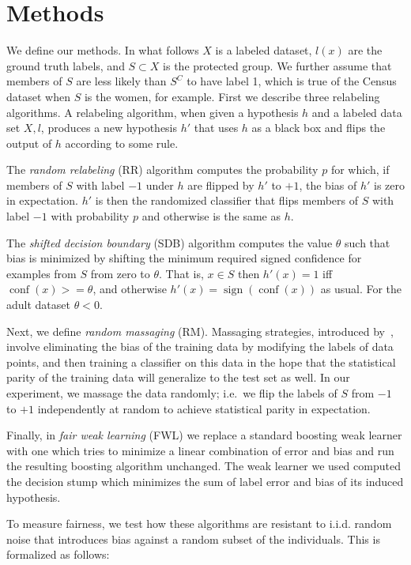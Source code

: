 \documentclass{article}
\DeclareMathOperator{\sign}{sign}
\DeclareMathOperator{\conf}{conf}
\begin{document}
\section{Methods} \label{sec:methods}

We define our methods. In what follows $X$ is a labeled dataset, $l(x)$ are the
ground truth labels, and $S \subset X$ is the protected group.  We further
assume that members of $S$ are less likely than $S^C$ to have label 1, which is
true of the Census dataset when $S$ is the women, for example.  First we
describe three relabeling algorithms.  A relabeling algorithm, when given a
hypothesis $h$ and a labeled data set $X, l$, produces a new hypothesis $h'$
that uses $h$ as a black box and flips the output of $h$ according to some
rule.

The \emph{random relabeling} (RR) algorithm computes the probability
$p$ for which, if members of $S$ with label $-1$ under $h$ are flipped by $h'$
to $+1$, the bias of $h'$ is zero in expectation.  $h'$ is then the randomized
classifier that flips members of $S$ with label $-1$ with probability $p$ and
otherwise is the same as $h$.

The \emph{shifted decision boundary} (SDB) algorithm computes the value
$\theta$ such that bias is minimized by shifting the minimum required signed
confidence for examples from $S$ from zero to $\theta$. That is, $x \in S$ then
$h'(x) = 1$ iff $\conf(x) >= \theta$, and otherwise $h'(x) = \sign(\conf(x))$
as usual. For the adult dataset $\theta < 0$.

Next, we define \emph{random massaging} (RM).  Massaging strategies, introduced
by~\citet{KamiranC09}, involve eliminating the bias of the training data by
modifying the labels of data points, and then training a classifier on this
data in the hope that the statistical parity of the training data will
generalize to the test set as well.  In our experiment, we massage the data
randomly; i.e.~we flip the labels of $S$ from $-1$ to $+1$ independently at
random to achieve statistical parity in expectation.

Finally, in \emph{fair weak learning} (FWL) we replace a standard boosting weak
learner with one which tries to minimize a linear combination of error and bias
and run the resulting boosting algorithm unchanged. The weak learner we used
computed the decision stump which minimizes the sum of label error and bias of
its induced hypothesis.

To measure fairness, we test how these algorithms are resistant to i.i.d.
random noise that introduces bias against a random subset of the individuals.
This is formalized as follows:
\end{document}
